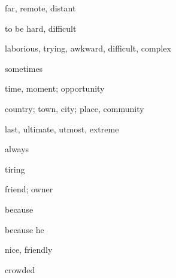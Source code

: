 \documentclass[avery5371,grid,frame]{flashcards}
\begin{document}
\begin{flashcard}{\LARGE far, remote, distant}
\LARGE {}
\end{flashcard}
\begin{flashcard}{\LARGE to be hard, difficult}
\LARGE {}
\end{flashcard}
\begin{flashcard}{\LARGE laborious, trying, awkward, difficult, complex}
\LARGE {}
\end{flashcard}
\begin{flashcard}{\LARGE sometimes}
\LARGE {}
\end{flashcard}
\begin{flashcard}{\LARGE time, moment; opportunity}
\LARGE {}
\end{flashcard}
\begin{flashcard}{\LARGE country; town, city; place, community}
\LARGE {}
\end{flashcard}
\begin{flashcard}{\LARGE last, ultimate, utmost, extreme}
\LARGE {}
\end{flashcard}
\begin{flashcard}{\LARGE always}
\LARGE {}
\end{flashcard}
\begin{flashcard}{\LARGE tiring}
\LARGE {}
\end{flashcard}
\begin{flashcard}{\LARGE friend; owner}
\LARGE {}
\end{flashcard}
\begin{flashcard}{\LARGE because}
\LARGE {}
\end{flashcard}
\begin{flashcard}{\LARGE because he}
\LARGE {}
\end{flashcard}
\begin{flashcard}{\LARGE nice, friendly}
\LARGE {}
\end{flashcard}
\begin{flashcard}{\LARGE crowded}
\LARGE {}
\end{flashcard}
\end{document}
